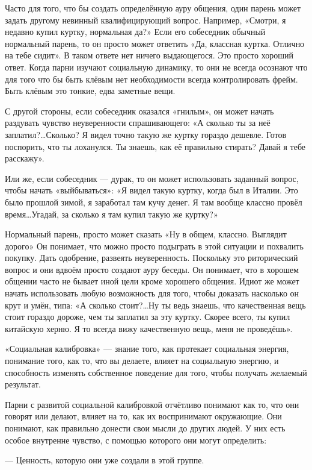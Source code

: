 Часто для того, что бы создать определённую ауру общения, один парень может задать другому невинный квалифицирующий вопрос. Например, «Смотри, я недавно купил куртку, нормальная да?» Если его собеседник обычный нормальный парень, то он просто может ответить «Да, классная куртка. Отлично на тебе сидит». В таком ответе нет ничего выдающегося. Это просто хороший ответ. Когда парни изучают социальную динамику, то они не всегда осознают что для того что бы быть клёвым нет необходимости всегда контролировать фрейм. Быть клёвым это тонкие, едва заметные вещи.

С другой стороны, если собеседник оказался «гнилым», он может начать раздувать чувство неуверенности спрашивающего: «А сколько ты за неё заплатил?\ldots Сколько? Я видел точно такую же куртку гораздо дешевле. Готов поспорить, что ты лоханулся. Ты знаешь, как её правильно стирать? Давай я тебе расскажу».

Или же, если собеседник --- дурак, то он может использовать заданный вопрос, чтобы начать «выйбываться»: «Я видел такую куртку, когда был в Италии. Это было прошлой зимой, я заработал там кучу денег. Я там вообще классно провёл время\ldots Угадай, за сколько я там купил такую же куртку?»

Нормальный парень, просто может сказать «Ну в общем, классно. Выглядит дорого» Он понимает, что можно просто подыграть в этой ситуации и похвалить покупку. Дать одобрение, развеять неуверенность. Поскольку это риторический вопрос и они вдвоём просто создают ауру беседы. Он понимает, что в хорошем общении часто не бывает иной цели кроме хорошего общения. Идиот же может начать использовать любую возможность для того, чтобы доказать насколько он крут и умён, типа: «А сколько стоит?\ldots Ну ты ведь знаешь, что качественная вещь стоит гораздо дороже, чем ты заплатил за эту куртку. Скорее всего, ты купил китайскую херню. Я то всегда вижу качественную вещь, меня не проведёшь».

«Социальная калибровка» --- знание того, как протекает социальная энергия, понимание того, как то, что вы делаете, влияет на социальную энергию, и способность изменять собственное поведение для того, чтобы получать желаемый результат.

Парни с развитой социальной калибровкой отчётливо понимают как то, что они говорят или делают, влияет на то, как их воспринимают окружающие. Они понимают, как правильно донести свои мысли до других людей. У них есть особое внутренне чувство, с помощью которого они могут определить:

--- Ценность, которую они уже создали в этой группе.

